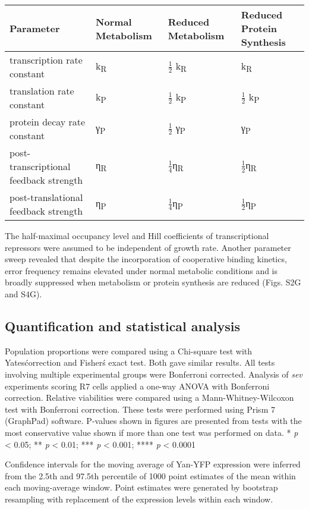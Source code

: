 \begin{longtable}[]{@{}llll@{}}
\toprule
\textbf{Parameter} & \textbf{Normal Metabolism} & \textbf{Reduced Metabolism} & \textbf{Reduced Protein Synthesis}\tabularnewline
\midrule
\endhead
transcription rate constant & k\textsubscript{R} & \(\frac{1}{2}\) k\textsubscript{R} & k\textsubscript{R}\tabularnewline
translation rate constant & k\textsubscript{P} & \(\frac{1}{2}\) k\textsubscript{P} & \(\frac{1}{2}\) k\textsubscript{P}\tabularnewline
protein decay rate constant & γ\textsubscript{P} & \(\frac{1}{2}\) γ\textsubscript{P} & γ\textsubscript{P}\tabularnewline
post-transcriptional feedback strength & η\textsubscript{R} & \(\frac{1}{4}\)η\textsubscript{R} & \(\frac{1}{2}\)η\textsubscript{R}\tabularnewline
post-translational feedback strength & η\textsubscript{P} & \(\frac{1}{4}\)η\textsubscript{P} & \(\frac{1}{2}\)η\textsubscript{P}\tabularnewline
\bottomrule
\end{longtable}

The half-maximal occupancy level and Hill coefficients of transcriptional repressors were assumed to be independent of growth rate. Another parameter sweep revealed that despite the incorporation of cooperative binding kinetics, error frequency remains elevated under normal metabolic conditions and is broadly suppressed when metabolism or protein synthesis are reduced (Figs. S2G and S4G).

\subsection{Quantification and statistical analysis}
\label{appendix:methods:metabolism:statistics}

Population proportions were compared using a Chi-square test with Yates\' correction and Fisher\'s exact test. Both gave similar results. All tests involving multiple experimental groups were Bonferroni corrected. Analysis of \textit{sev} experiments scoring R7 cells applied a one-way ANOVA with Bonferroni correction. Relative viabilities were compared using a Mann-Whitney-Wilcoxon test with Bonferroni correction. These tests were performed using Prism 7 (GraphPad) software. P-values shown in figures are presented from tests with the most conservative value shown if more than one test was performed on data. * \textit{p} \textless{} 0.05; ** \textit{p} \textless{} 0.01; *** \textit{p} \textless{} 0.001; **** \textit{p} \textless{} 0.0001

Confidence intervals for the moving average of Yan-YFP expression were inferred from the 2.5th and 97.5th percentile of 1000 point estimates of the mean within each moving-average window. Point estimates were generated by bootstrap resampling with replacement of the expression levels within each window.

